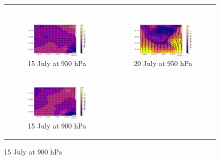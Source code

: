 \begin{figure}[hbtp]
\begin{tabular}{cc}
\begin{subfigure}[t]{0.5\textwidth}
        \end{subfigure} \\
        \begin{subfigure}[t]{0.5\textwidth}
            \caption{15 July at 950 hPa}
            \includegraphics[width=\textwidth]{images/chap5/IOP_maps/mesoNH_wind_950_2021-07-15T12:00:00.png}
        \end{subfigure} &
        \begin{subfigure}[t]{0.5\textwidth}
            \caption{20 July at 950 hPa}
            \includegraphics[width=\textwidth]{images/chap5/IOP_maps/mesoNH_wind_950_2021-07-20T12:00:00.png}
        \end{subfigure} \\
        \begin{subfigure}[t]{0.5\textwidth}
            \caption{15 July at 900 hPa}
            \includegraphics[width=\textwidth]{images/chap5/IOP_maps/mesoNH_wind_900_2021-07-15T12:00:00.png}

\end{subfigure}
\end{tabular}
\end{figure}
